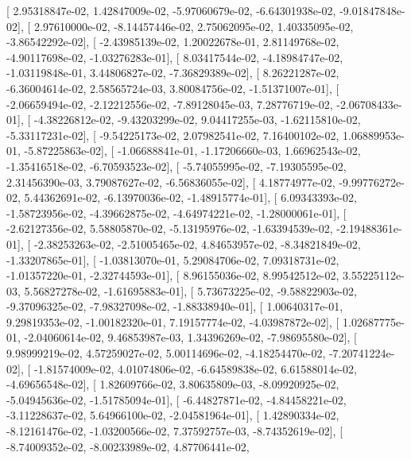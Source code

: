 \documentclass{article}
\begin{document}
       [  2.95318847e-02,   1.42847009e-02,  -5.97060679e-02,
         -6.64301938e-02,  -9.01847848e-02],
       [  2.97610000e-02,  -8.14457446e-02,   2.75062095e-02,
          1.40335095e-02,  -3.86542292e-02],
       [ -2.43985139e-02,   1.20022678e-01,   2.81149768e-02,
         -4.90117698e-02,  -1.03276283e-01],
       [  8.03417544e-02,  -4.18984747e-02,  -1.03119848e-01,
          3.44806827e-02,  -7.36829389e-02],
       [  8.26221287e-02,  -6.36004614e-02,   2.58565724e-03,
          3.80084756e-02,  -1.51371007e-01],
       [ -2.06659494e-02,  -2.12212556e-02,  -7.89128045e-03,
          7.28776719e-02,  -2.06708433e-01],
       [ -4.38226812e-02,  -9.43203299e-02,   9.04417255e-03,
         -1.62115810e-02,  -5.33117231e-02],
       [ -9.54225173e-02,   2.07982541e-02,   7.16400102e-02,
          1.06889953e-01,  -5.87225863e-02],
       [ -1.06688841e-01,  -1.17206660e-03,   1.66962543e-02,
         -1.35416518e-02,  -6.70593523e-02],
       [ -5.74055995e-02,  -7.19305595e-02,   2.31456390e-03,
          3.79087627e-02,  -6.56836055e-02],
       [  4.18774977e-02,  -9.99776272e-02,   5.44362691e-02,
         -6.13970036e-02,  -1.48915774e-01],
       [  6.09343393e-02,  -1.58723956e-02,  -4.39662875e-02,
         -4.64974221e-02,  -1.28000061e-01],
       [ -2.62127356e-02,   5.58805870e-02,  -5.13195976e-02,
         -1.63394539e-02,  -2.19488361e-01],
       [ -2.38253263e-02,  -2.51005465e-02,   4.84653957e-02,
         -8.34821849e-02,  -1.33207865e-01],
       [ -1.03813070e-01,   5.29084706e-02,   7.09318731e-02,
         -1.01357220e-01,  -2.32744593e-01],
       [  8.96155036e-02,   8.99542512e-02,   3.55225112e-03,
          5.56827278e-02,  -1.61695883e-01],
       [  5.73673225e-02,  -9.58822903e-02,  -9.37096325e-02,
         -7.98327098e-02,  -1.88338940e-01],
       [  1.00640317e-01,   9.29819353e-02,  -1.00182320e-01,
          7.19157774e-02,  -4.03987872e-02],
       [  1.02687775e-01,  -2.04060614e-02,   9.46853987e-03,
          1.34396269e-02,  -7.98695580e-02],
       [  9.98999219e-02,   4.57259027e-02,   5.00114696e-02,
         -4.18254470e-02,  -7.20741224e-02],
       [ -1.81574009e-02,   4.01074806e-02,  -6.64589838e-02,
          6.61588014e-02,  -4.69656548e-02],
       [  1.82609766e-02,   3.80635809e-03,  -8.09920925e-02,
         -5.04945636e-02,  -1.51785094e-01],
       [ -6.44827871e-02,  -4.84458221e-02,  -3.11228637e-02,
          5.64966100e-02,  -2.04581964e-01],
       [  1.42890334e-02,  -8.12161476e-02,  -1.03200566e-02,
          7.37592757e-03,  -8.74352619e-02],
       [ -8.74009352e-02,  -8.00233989e-02,   4.87706441e-02,
\end{document}
